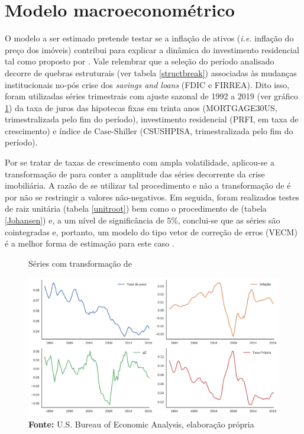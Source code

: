 \section{Modelo macroeconométrico}
\label{Modelo_empirico}

O modelo a ser estimado pretende testar se a inflação de ativos (\textit{i.e.} inflação do preço dos imóveis) contribui para explicar a dinâmica do investimento residencial tal como proposto por \textcite{teixeira_crescimento_2015}. 
Vale relembrar que a seleção do período analisado decorre de quebras estruturais (ver tabela \ref{structbreak}) associadas às mudanças institucionais no-pós crise dos \textit{savings and loans} (FDIC e FIRREA).
Dito isso, foram utilizadas séries trimestrais com ajuste sazonal de 1992 a 2019 (ver gráfico \ref{YeoJhonson}) da taxa de juros das hipotecas fixas em trinta anos (MORTGAGE30US, trimestralizada pelo fim do período), investimento residencial (PRFI, em taxa de crescimento) e índice de Case-Shiller (CSUSHPISA, trimestralizada pelo fim do período). 

Por se tratar de taxas de crescimento com ampla volatilidade, aplicou-se a transformação de \textcite{yeo_new_2000} para conter a amplitude das séries decorrente da crise imobiliária. A razão de se utilizar tal procedimento e não a transformação de \textcite{box_analysis_1964} é por não se restringir a valores não-negativos. Em seguida, foram realizados testes de raiz unitária (tabela \ref{unitroot}) bem como o procedimento de \textcite{johansen_estimation_1991} (tabela \ref{Johansen}) e, a um nível de significância de 5\%, conclui-se que as séries são cointegradas e, portanto, um modelo do tipo vetor de correção de erros (VECM) é a melhor forma de estimação para este caso \cite{enders_applied_2014}.


\begin{figure}[H]
	\centering
	\caption{Séries com transformação de \textcite{yeo_new_2000}}
	\label{YeoJhonson}
	\includegraphics[width=\textwidth]{../../Dados/Fatos_Estilizados/figs/YeoJohnson_All.png}
	\caption*{\textbf{Fonte:} U.S. Bureau of Economic Analysis, elaboração própria}
\end{figure}


